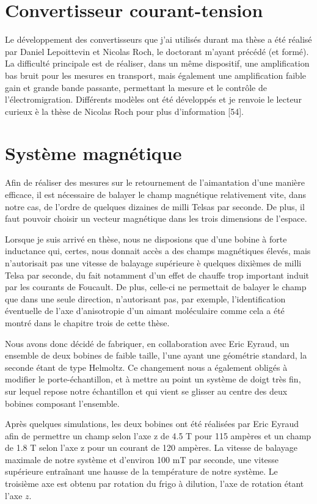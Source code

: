 \section{Convertisseur courant-tension}
Le développement des convertisseurs que j’ai utilisés durant ma thèse a été réalisé par Daniel Lepoittevin et Nicolas Roch, le doctorant m’ayant précédé (et formé). La difficulté principale est de réaliser, dans un même
dispositif, une amplification bas bruit pour les mesures en transport, mais également une amplification faible gain et grande bande passante, permettant la mesure et le contrôle de l’électromigration. Différents modèles ont été développés et je renvoie le lecteur curieux è la thèse de Nicolas Roch pour plus d’information [54].


\section{Système magnétique}
Afin de réaliser des mesures sur le retournement de l’aimantation d’une manière efficace, il est nécessaire de balayer le champ magnétique relativement vite, dans notre cas, de l’ordre de quelques dizaines de milli Telsas par seconde. De plus, il faut pouvoir choisir un vecteur magnétique dans les trois dimensions de l’espace.

Lorsque je suis arrivé en thèse, nous ne disposions que d’une bobine à forte inductance qui, certes, nous donnait accès a des champs magnétiques élevés, mais n’autorisait pas une vitesse de balayage supérieure è quelques
dixièmes de milli Telsa par seconde, du fait notamment d’un effet de chauffe trop important induit par les courants de Foucault. De plus, celle-ci ne permettait de balayer le champ que dans une seule direction, n’autorisant pas, par exemple, l’identification éventuelle de l’axe d’anisotropie d’un aimant moléculaire comme cela a été montré dans le chapitre trois de cette thèse. 

Nous avons donc décidé de fabriquer, en collaboration avec Eric Eyraud, un ensemble de deux bobines de faible taille, l’une ayant une géométrie standard, la seconde étant de type Helmoltz. Ce changement nous a également
obligés à modifier le porte-échantillon, et à mettre au point un système de doigt très fin, sur lequel repose notre échantillon et qui vient se glisser au centre des deux bobines composant l’ensemble.

Après quelques simulations, les deux bobines ont été réalisées par Eric Eyraud afin de permettre un champ selon l’axe z de 4.5 T pour 115 ampères et un champ de 1.8 T selon l’axe z pour un courant de 120 ampères. La vitesse
de balayage maximale de notre système et d’environ 100 mT par seconde, une vitesse supérieure entraînant une hausse de la température de notre système. Le troisième axe est obtenu par rotation du frigo à dilution, l’axe de rotation étant l’axe $z$.

